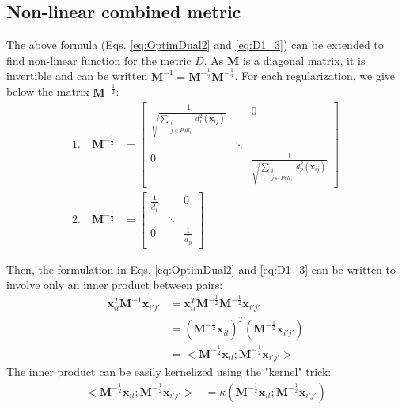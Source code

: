 \newpage
\subsection{Non-linear combined metric}
The above formula (Eqs. \ref{eq:OptimDual2} and \ref{eq:D1_3}) can be extended to find non-linear function for the metric $D$. As $\textbf{M}$ is a diagonal matrix, it is invertible and can be written $\textbf{M}^{-1} = \textbf{M}^{-\frac{1}{2}} \textbf{M}^{-\frac{1}{2}}$. For each regularization, we give below the matrix $\textbf{M}^{-\frac{1}{2}}$:
\begin{align}
	1. \quad \textbf{M}^{-\frac{1}{2}} &= 
	\begin{bmatrix} 
		\frac{1}{\sqrt{\sum\limits_{\substack{i \\ j \in Pull_i}} d_1^2(\textbf{x}_{ij})}} 		&  	& 0 \\ 
		& \ddots 	&  \\ 
		0 		&  	& 
		\frac{1}{\sqrt{\sum\limits_{\substack{i \\ j \in Pull_i}} d_p^2(\textbf{x}_{ij})}}
	\end{bmatrix} \label{eq:M_12} \\
	2. \quad \textbf{M}^{-\frac{1}{2}} &= 
	\begin{bmatrix} 
		\frac{1}{\bar{d_1}} &  	& 0 \\ 
		& \ddots 	&  \\ 
		0 		&  	& \frac{1}{\bar{d_p}}
	\end{bmatrix} \label{eq:M_22}
\end{align}

\noindent Then, the formulation in Eqs. \ref{eq:OptimDual2} and \ref{eq:D1_3} can be written to involve only an inner product between pairs:
\begin{align}
	\textbf{x}_{il}^T \textbf{M}^{-1} \textbf{x}_{i'j'}
	& = \textbf{x}_{il}^T \textbf{M}^{-\frac{1}{2}} \textbf{M}^{-\frac{1}{2}} \textbf{x}_{i'j'}	\nonumber	\\
	& = \left( \textbf{M}^{-\frac{1}{2}} \textbf{x}_{il} \right)^T \left( \textbf{M}^{-\frac{1}{2}} \textbf{x}_{i'j'} \right) \nonumber \\
	& = <\textbf{M}^{-\frac{1}{2}} \textbf{x}_{il} ; \textbf{M}^{-\frac{1}{2}} \textbf{x}_{i'j'} > \nonumber
\end{align}
The inner product can be easily kernelized using the "kernel" trick:
\begin{align}
	<\textbf{M}^{-\frac{1}{2}} \textbf{x}_{il} ; \textbf{M}^{-\frac{1}{2}} \textbf{x}_{i'j'} >
	& = \kappa(\textbf{M}^{-\frac{1}{2}} \textbf{x}_{il} ;  \textbf{M}^{-\frac{1}{2}} \textbf{x}_{i'j'} ) \nonumber	
\end{align}

